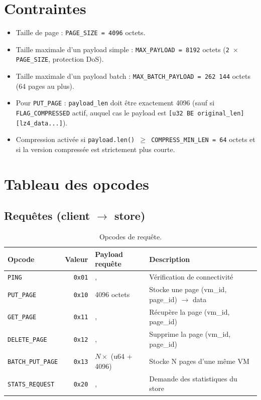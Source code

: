 \section{Contraintes}

\begin{itemize}[leftmargin=*]
    \item Taille de page : \texttt{PAGE\_SIZE = 4096} octets.
    \item Taille maximale d'un payload simple : \texttt{MAX\_PAYLOAD = 8192} octets (\texttt{2 $\times$ PAGE\_SIZE}, protection DoS).
    \item Taille maximale d'un payload batch : \texttt{MAX\_BATCH\_PAYLOAD = 262 144} octets (64 pages au plus).
    \item Pour \texttt{PUT\_PAGE} : \texttt{payload\_len} doit être exactement 4096 (sauf si \texttt{FLAG\_COMPRESSED} actif, auquel cas le payload est \texttt{[u32~BE original\_len][lz4\_data...]}).
    \item Compression activée si \texttt{payload.len() $\ge$ COMPRESS\_MIN\_LEN = 64} octets et si la version compressée est strictement plus courte.
\end{itemize}

\section{Tableau des opcodes}

\subsection{Requêtes (client $\to$ store)}

\begin{table}[H]
\centering
\small
\caption{Opcodes de requête.}
\begin{tabular}{lrlp{7cm}}
\toprule
\textbf{Opcode} & \textbf{Valeur} & \textbf{Payload requête} & \textbf{Description} \\
\midrule
\texttt{PING}            & \texttt{0x01} &,             & Vérification de connectivité \\
\texttt{PUT\_PAGE}       & \texttt{0x10} & 4096 octets     & Stocke une page (vm\_id, page\_id) $\to$ data \\
\texttt{GET\_PAGE}       & \texttt{0x11} &,             & Récupère la page (vm\_id, page\_id) \\
\texttt{DELETE\_PAGE}    & \texttt{0x12} &,             & Supprime la page (vm\_id, page\_id) \\
\texttt{BATCH\_PUT\_PAGE}& \texttt{0x13} & $N \times$ (u64 + 4096) & Stocke N pages d'une même VM \\
\texttt{STATS\_REQUEST}  & \texttt{0x20} &,             & Demande des statistiques du store \\
\bottomrule
\end{tabular}

\label{tab:opcodes-req}
\end{table}

